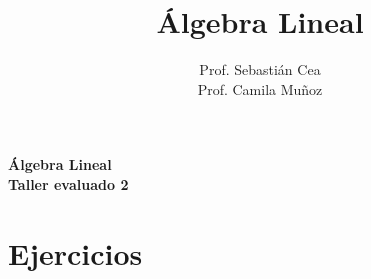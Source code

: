 \documentclass[12pt]{article}
\title{\'Algebra Lineal}
\author{Prof. Sebasti\'an Cea \\Prof. Camila Muñoz\\
}
\date{}
\theoremstyle{exampstyle}
\theoremstyle{definition}
\theoremstyle{break}
\numberwithin{equation}{section}
\begin{document}

\begin{minipage}[r]{15cm}


\end{minipage}

\begin{center}
\Large{\textbf{\'Algebra Lineal\\Taller evaluado 2  }}
\end{center}

\section{Ejercicios}
\end{document}
